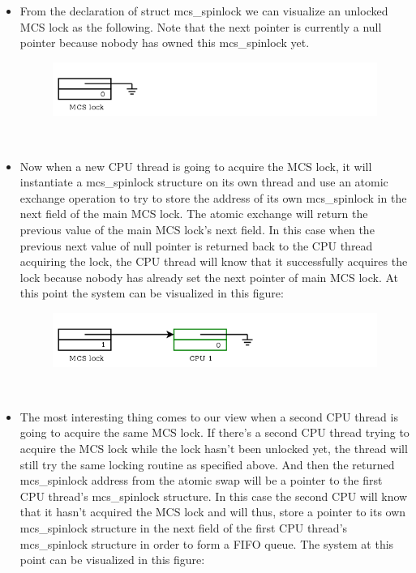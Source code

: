 \documentclass[10pt]{sigplanconf}
\begin{document}
\begin{itemize}
	\item From the declaration of struct mcs\_spinlock we can visualize an unlocked MCS lock as the following. Note that the next pointer is currently a null pointer because nobody has owned this mcs\_spinlock yet. 
	\begin{figure}[h]
		\includegraphics[scale=0.4]{mcslock1.png}
	\end{figure}\\
	\item Now when a new CPU thread is going to acquire the MCS lock, it will instantiate a mcs\_spinlock structure on its own thread and use an atomic exchange operation to try to store the address of its own mcs\_spinlock in the next field of the main MCS lock. The atomic exchange will return the previous value of the main MCS lock's next field. In this case when the previous next value of null pointer is returned back to the CPU thread acquiring the lock, the CPU thread will know that it successfully acquires the lock because nobody has already set the next pointer of main MCS lock. At this point the system can be visualized in this figure:\\
	\begin{figure}[h!]
		\includegraphics[scale=0.4]{mcslock2.png}
	\end{figure}\\
	\item The most interesting thing comes to our view when a second CPU thread is going to acquire the same MCS lock. If there's a second CPU thread trying to acquire the MCS lock while the lock hasn't been unlocked yet, the thread will still try the same locking routine as specified above. And then the returned mcs\_spinlock address from the atomic swap will be a pointer to the first CPU thread's mcs\_spinlock structure. In this case the second CPU will know that it hasn't acquired the MCS lock and will thus, store a pointer to its own mcs\_spinlock structure in the next field of the first CPU thread's mcs\_spinlock structure in order to form a FIFO queue. The system at this point can be visualized in this figure:

\end{itemize}
\end{document}
